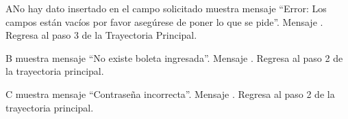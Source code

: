 	\begin{UCtrayectoriaA}{A}{No hay dato insertado en el campo solicitado}
		\UCpaso muestra mensaje “Error: Los campos están vacíos por favor asegúrese de poner lo que se pide”. Mensaje .
		\UCpaso Regresa al paso 3 de la Trayectoria Principal.
	\end{UCtrayectoriaA}
	
	\begin{UCtrayectoriaA}{B}{}
		\UCpaso muestra mensaje “No existe boleta ingresada”. Mensaje .
		\UCpaso Regresa al paso 2 de la trayectoria principal.
	\end{UCtrayectoriaA}
	
	\begin{UCtrayectoriaA}{C}{}
		\UCpaso muestra mensaje “Contraseña incorrecta”. Mensaje .
		\UCpaso Regresa al paso 2 de la trayectoria principal.
	\end{UCtrayectoriaA}